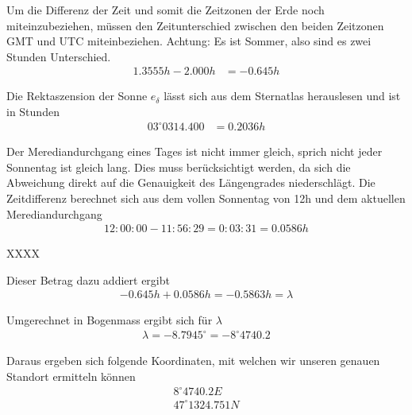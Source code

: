\begin{refsection}
Um die Differenz der Zeit und somit die Zeitzonen der Erde noch miteinzubeziehen, müssen den Zeitunterschied zwischen den beiden Zeitzonen GMT und UTC miteinbeziehen. Achtung: Es ist Sommer, also sind es zwei Stunden Unterschied.
\begin{align*}
1.3555h - 2.000h &= -0.645h
\end{align*}

Die Rektaszension der Sonne $e_\delta$ lässt sich aus dem Sternatlas herauslesen und ist in Stunden
\begin{align*}
03^{\circ} 03 14.400 &= 0.2036h
\end{align*}


Der Merediandurchgang eines Tages ist nicht immer gleich, sprich nicht jeder Sonnentag ist gleich lang. Dies muss berücksichtigt werden, da sich die Abweichung direkt auf die Genauigkeit des Längengrades niederschlägt.
Die Zeitdifferenz berechnet sich aus dem vollen Sonnentag von 12h und dem aktuellen Merediandurchgang
\begin{align*}
12:00:00 - 11:56:29 = 0:03:31 = 0.0586 h
\end{align*}




XXXX




Dieser Betrag dazu addiert ergibt
\begin{align*}
-0.645 h + 0.0586 h = - 0.5863 h = \lambda
\end{align*}

Umgerechnet in Bogenmass ergibt sich für $\lambda$
\begin{align*}
\lambda = - 8.7945^{\circ} = -8^{\circ} 47 40.2 
\end{align*}



Daraus ergeben sich folgende Koordinaten, mit welchen wir unseren genauen Standort ermitteln können
\begin{align*}
8^{\circ}47 40.2 E \\
47^{\circ}13 24.751 N
\end{align*}




\printbibliography[heading=subbibliography]
\end{refsection}







